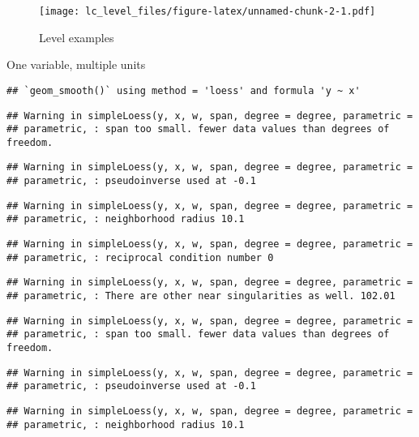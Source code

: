 \documentclass[]{article}
\begin{document}
\begin{figure}
\centering
\texttt{[image: lc\_level\_files/figure-latex/unnamed-chunk-2-1.pdf]}
\caption{Level examples\label{level}}
\end{figure}

One variable, multiple units

\begin{verbatim}
## `geom_smooth()` using method = 'loess' and formula 'y ~ x'
\end{verbatim}

\begin{verbatim}
## Warning in simpleLoess(y, x, w, span, degree = degree, parametric =
## parametric, : span too small. fewer data values than degrees of freedom.
\end{verbatim}

\begin{verbatim}
## Warning in simpleLoess(y, x, w, span, degree = degree, parametric =
## parametric, : pseudoinverse used at -0.1
\end{verbatim}

\begin{verbatim}
## Warning in simpleLoess(y, x, w, span, degree = degree, parametric =
## parametric, : neighborhood radius 10.1
\end{verbatim}

\begin{verbatim}
## Warning in simpleLoess(y, x, w, span, degree = degree, parametric =
## parametric, : reciprocal condition number 0
\end{verbatim}

\begin{verbatim}
## Warning in simpleLoess(y, x, w, span, degree = degree, parametric =
## parametric, : There are other near singularities as well. 102.01
\end{verbatim}

\begin{verbatim}
## Warning in simpleLoess(y, x, w, span, degree = degree, parametric =
## parametric, : span too small. fewer data values than degrees of freedom.
\end{verbatim}

\begin{verbatim}
## Warning in simpleLoess(y, x, w, span, degree = degree, parametric =
## parametric, : pseudoinverse used at -0.1
\end{verbatim}

\begin{verbatim}
## Warning in simpleLoess(y, x, w, span, degree = degree, parametric =
## parametric, : neighborhood radius 10.1
\end{verbatim}
\end{document}
